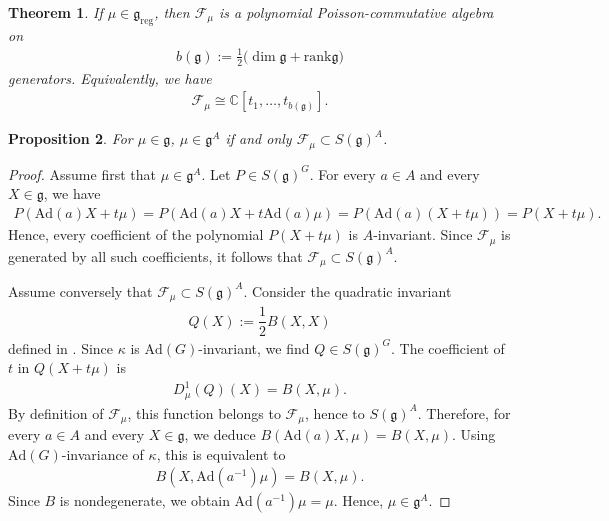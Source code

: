 \documentclass[11pt,reqno]{amsart}
\newtheorem*{theorem A}{Main Theorem A}
\newtheorem*{theorem B}{Main Theorem B}
\newtheorem*{theorem C}{Main Theorem C}
\newtheorem*{theorem D}{Main Theorem D}
\newtheorem{theorem}{Theorem}[section]
\newtheorem{proposition}[theorem]{Proposition}
\theoremstyle{definition}
\theoremstyle{plain}
\theoremstyle{conclusion}
\begin{document}
\begin{theorem}
\label{thm:mfalgebra} \cite{MF78}
If $\mu \in \mathfrak{g}_{\mathrm{reg}}$, then $\mathcal{F}_\mu$ is a polynomial Poisson-commutative algebra on \begin{align*}
b(\mathfrak{g}) := \frac{1}{2}\big(\dim \mathfrak{g} + \mathrm{rank}\mathfrak{g}\big)
\end{align*} generators. Equivalently, we have \begin{align*}
\mathcal{F}_\mu \cong \mathbb{C}[t_1,\dots,t_{b(\mathfrak{g})}].
\end{align*}
\end{theorem}

\begin{proposition}
\label{prop:mfcriterion}
For $\mu \in \mathfrak{g}$, $\mu \in \mathfrak{g}^A$ if and only $\mathcal{F}_\mu \subset S(\mathfrak{g})^A$. 
\end{proposition}

\begin{proof}
Assume first that $\mu \in \mathfrak{g}^A$. Let $P \in S(\mathfrak{g})^G$. For every $a \in A$ and every $X \in \mathfrak{g}$, we have \begin{align*}
P(\mathrm{Ad}(a)X+t\mu) = P(\mathrm{Ad}(a)X+t\mathrm{Ad}(a)\mu) = P(\mathrm{Ad}(a)(X+t\mu)) = P(X+t\mu).
\end{align*} Hence, every coefficient of the polynomial $P(X+t\mu)$ is $A$-invariant. Since $\mathcal{F}_\mu$ is generated by all such coefficients, it follows that  $\mathcal{F}_\mu \subset S(\mathfrak{g})^A$. 

Assume conversely that $\mathcal{F}_\mu \subset S(\mathfrak{g})^A$. Consider the quadratic invariant \begin{align*}
Q(X) := \dfrac{1}{2}B (X,X) 
\end{align*} defined in \cite{Vin91}.
Since $\kappa$ is $\mathrm{Ad}(G)$-invariant, we find $Q \in S(\mathfrak{g})^G$. The coefficient of $t$ in $Q(X+t\mu)$ is \begin{align*}
D_\mu^1(Q)(X) = B (X,\mu).
\end{align*} By definition of $\mathcal{F}_\mu$, this function belongs to $\mathcal{F}_\mu$, hence to $S(\mathfrak{g})^A$. Therefore, for every $a \in A$ and every $X \in \mathfrak{g}$, we deduce $B (\mathrm{Ad}(a)X,\mu) = B (X,\mu)$. Using $\mathrm{Ad}(G)$-invariance of $\kappa$, this is equivalent to \begin{align*}
B (X,\mathrm{Ad}(a^{-1})\mu) = B (X,\mu).
\end{align*}
Since $B$ is nondegenerate, we obtain $\mathrm{Ad}(a^{-1})\mu = \mu$. Hence, $\mu \in \mathfrak{g}^A$.
\end{proof}
\end{document}
